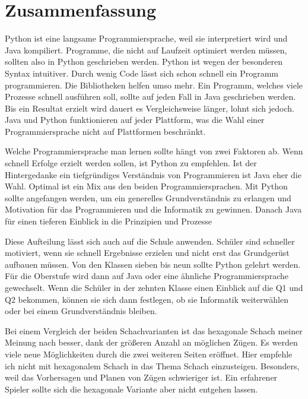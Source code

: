 \chapter{Zusammenfassung}

Python ist eine langsame Programmiersprache, weil sie interpretiert wird und Java kompiliert. Programme, die nicht auf Laufzeit optimiert werden müssen, sollten also in Python geschrieben werden. Python ist wegen der besonderen Syntax intuitiver. Durch wenig Code lässt sich schon schnell ein Programm programmieren. Die Bibliotheken helfen umso mehr. Ein Programm, welches viele Prozesse schnell ausführen soll, sollte auf jeden Fall in Java geschrieben werden. Bis ein Resultat erzielt wird dauert es Vergleichsweise länger, lohnt sich jedoch. Java und Python funktionieren auf jeder Plattform, was die Wahl einer Programmiersprache nicht auf Plattformen beschränkt.\par
Welche Programmiersprache man lernen sollte hängt von zwei Faktoren ab. Wenn schnell Erfolge erzielt werden sollen, ist Python zu empfehlen. Ist der Hintergedanke ein tiefgründiges Verständnis von Programmieren ist Java eher die Wahl. Optimal ist ein Mix aus den beiden Programmiersprachen. Mit Python sollte angefangen werden, um ein generelles Grundverständnis zu erlangen und Motivation für das Programmieren und die Informatik zu gewinnen. Danach Java für einen tieferen Einblick in die Prinzipien und Prozesse\par
Diese Aufteilung lässt sich auch auf die Schule anwenden. Schüler sind schneller motiviert, wenn sie schnell Ergebnisse erzielen und nicht erst das Grundgerüst aufbauen müssen. Von den Klassen sieben bis neun sollte Python gelehrt werden. Für die Oberstufe wird dann auf Java oder eine ähnliche Programmiersprache gewechselt. Wenn die Schüler in der zehnten Klasse einen Einblick auf die Q1 und Q2 bekommen, können sie sich dann festlegen, ob sie Informatik weiterwählen oder bei einem Grundverständnis bleiben.\par
Bei einem Vergleich der beiden Schachvarianten ist das hexagonale Schach meiner Meinung nach besser, dank der größeren Anzahl an möglichen Zügen. Es werden viele neue Möglichkeiten durch die zwei weiteren Seiten eröffnet. Hier empfehle ich nicht mit hexagonalem Schach in das Thema Schach einzusteigen. Besonders, weil das Vorhersagen und Planen von Zügen schwieriger ist. Ein erfahrener Spieler sollte sich die hexagonale Variante aber nicht entgehen lassen.
